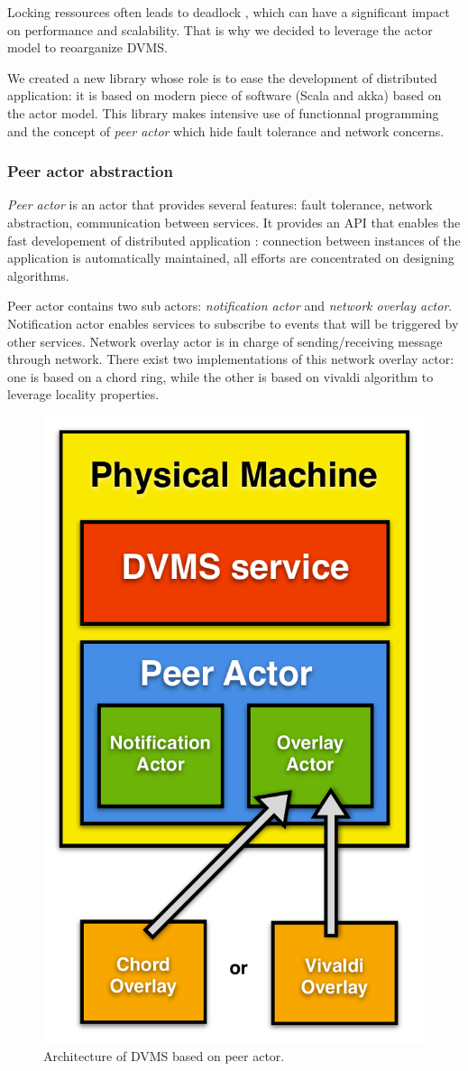 Locking ressources often leads to deadlock \cite{agha1985actors}, which can have
a significant impact on performance and scalability. That is why we decided to
leverage the actor model to reoarganize DVMS.

We created a new library whose role is to ease the development of distributed
application: it is based on modern piece of software (Scala and akka) based on
the actor model. This library makes intensive use of functionnal programming 
and the concept of \emph{peer actor} which hide fault tolerance and network
concerns.

\subsubsection{Peer actor abstraction}

\emph{Peer actor} is an actor that provides several features: fault tolerance,
network abstraction, communication between services. It provides an API that 
enables the fast developement of distributed application : connection between
instances of the application is automatically maintained, all efforts are 
concentrated on designing algorithms.

Peer actor contains two sub actors: \emph{notification actor} and \emph{network
overlay actor}. Notification actor enables services to subscribe to events that
will be triggered by other services. Network overlay actor is in charge of 
sending/receiving message through network. There exist two implementations of 
this network overlay actor: one is based on a chord ring, while the other is 
based on vivaldi algorithm to leverage locality properties.

\begin{figure}[h!]
  \centering
  \includegraphics[width=0.5\linewidth]{Figures/DVMS.pdf}
  \caption{Architecture of DVMS based on peer actor.}%
  \label{fig:isp}%
\end{figure}

